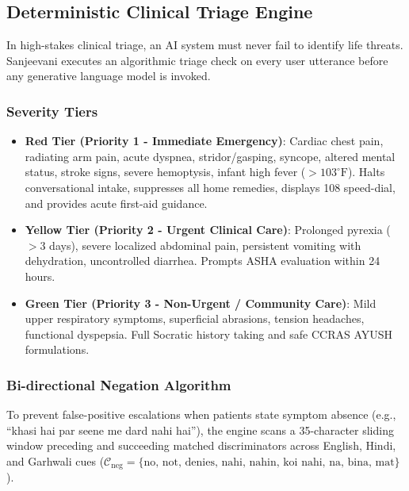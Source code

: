 \documentclass[conference]{IEEEtran}
\begin{document}
\subsection{Deterministic Clinical Triage Engine}
In high-stakes clinical triage, an AI system must never fail to identify life threats. Sanjeevani executes an algorithmic triage check on every user utterance before any generative language model is invoked.

\subsubsection{Severity Tiers}
\begin{itemize}
    \item \textbf{Red Tier (Priority 1 - Immediate Emergency)}: Cardiac chest pain, radiating arm pain, acute dyspnea, stridor/gasping, syncope, altered mental status, stroke signs, severe hemoptysis, infant high fever ($>103^\circ\text{F}$). Halts conversational intake, suppresses all home remedies, displays 108 speed-dial, and provides acute first-aid guidance.
    \item \textbf{Yellow Tier (Priority 2 - Urgent Clinical Care)}: Prolonged pyrexia ($>3$ days), severe localized abdominal pain, persistent vomiting with dehydration, uncontrolled diarrhea. Prompts ASHA evaluation within 24 hours.
    \item \textbf{Green Tier (Priority 3 - Non-Urgent / Community Care)}: Mild upper respiratory symptoms, superficial abrasions, tension headaches, functional dyspepsia. Full Socratic history taking and safe CCRAS AYUSH formulations.
\end{itemize}

\subsubsection{Bi-directional Negation Algorithm}
To prevent false-positive escalations when patients state symptom absence (e.g., ``khasi hai par seene me dard nahi hai''), the engine scans a 35-character sliding window preceding and succeeding matched discriminators across English, Hindi, and Garhwali cues ($\mathcal{C}_{\text{neg}} = \{\text{no, not, denies, nahi, nahin, koi nahi, na, bina, mat}\}$).
\end{document}
